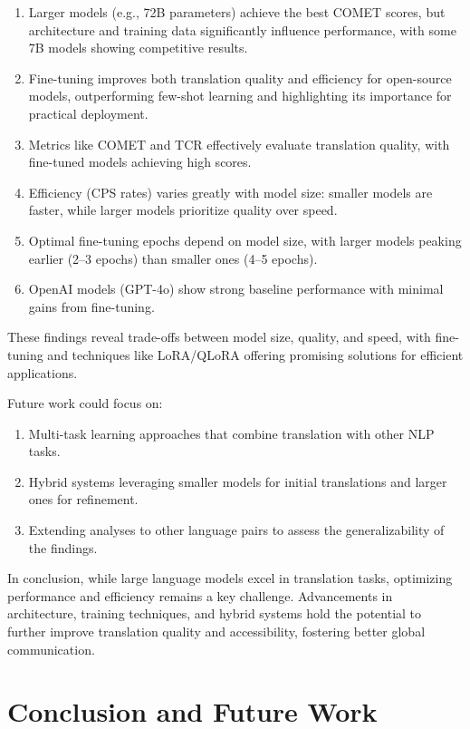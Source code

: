 \documentclass[conference]{IEEEtran}
\begin{document}
\begin{enumerate}
    \item Larger models (e.g., 72B parameters) achieve the best COMET scores, but architecture and training data significantly influence performance, with some 7B models showing competitive results.
    \item Fine-tuning improves both translation quality and efficiency for open-source models, outperforming few-shot learning and highlighting its importance for practical deployment.
    \item Metrics like COMET and TCR effectively evaluate translation quality, with fine-tuned models achieving high scores.
    \item Efficiency (CPS rates) varies greatly with model size: smaller models are faster, while larger models prioritize quality over speed.
    \item Optimal fine-tuning epochs depend on model size, with larger models peaking earlier (2--3 epochs) than smaller ones (4--5 epochs).
    \item OpenAI models (GPT-4o) show strong baseline performance with minimal gains from fine-tuning.
\end{enumerate}

These findings reveal trade-offs between model size, quality, and speed, with fine-tuning and techniques like LoRA/QLoRA offering promising solutions for efficient applications.

Future work could focus on:
\begin{enumerate}
    \item Multi-task learning approaches that combine translation with other NLP tasks.
    \item Hybrid systems leveraging smaller models for initial translations and larger ones for refinement.
    \item Extending analyses to other language pairs to assess the generalizability of the findings.
\end{enumerate}

In conclusion, while large language models excel in translation tasks, optimizing performance and efficiency remains a key challenge. Advancements in architecture, training techniques, and hybrid systems hold the potential to further improve translation quality and accessibility, fostering better global communication.

\iffalse
\section{Conclusion and Future Work}
\end{document}
